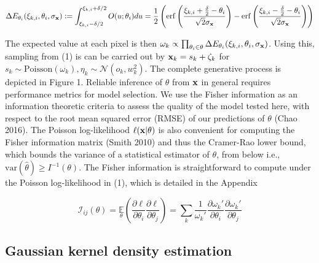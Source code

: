 \documentclass{article}
\begin{document}
\begin{equation}
\Delta E_{\theta_{i}}(\xi_{k,i},\theta_{i},\sigma_{\bold{x}}) \vcentcolon = \int_{\xi_{k,i}-\delta /2}^{\xi_{k,i}+\delta /2} O(u;\theta_{i})du = \frac{1}{2}\left(\mathrm{erf}\left(\frac{\xi_{k,i}+\frac{\delta}{2}-\theta_{i}}{\sqrt{2}\sigma_{\bold{x}}}\right) -\mathrm{erf}\left(\frac{\xi_{k,i}-\frac{\delta}{2}-\theta_{i}}{\sqrt{2}\sigma_{\bold{x}}}\right)\right)
\end{equation}

The expected value at each pixel is then $\omega_{k}\propto \prod_{\theta_{i}\in \theta} \Delta E_{\theta_{i}}(\xi_{k,i},\theta_{i},\sigma_{\bold{x}}) $. Using this, sampling from (1) is can be carried out by $\bold{x}_{k} = s_{k} + \zeta_{k}$ for $s_{k}\sim \mathrm{Poisson}(\omega_{k}), \eta_{k}\sim \mathcal{N}(o_{k},w_{k}^{2})$. The complete generative process is depicted in Figure 1. Reliable inference of $\theta$ from $\bold{x}$ in general requires performance metrics for model selection. We use the Fisher information as an information theoretic criteria to assess the quality of the model tested here, with respect to the root mean squared error (RMSE) of our predictions of $\theta$ (Chao 2016). The Poisson log-likelihood $\ell(\bold{x}|\theta)$ is also convenient for computing the Fisher information matrix (Smith 2010) and thus the Cramer-Rao lower bound, which bounds the variance of a statistical estimator of $\theta$, from below i.e., $\mathrm{var}(\hat{\theta}) \geq I^{-1}(\theta)$. The Fisher information is straightforward to compute under the Poisson log-likelihood in (1), which is detailed in the Appendix

\begin{equation}
\mathcal{I}_{ij}(\theta) = \underset{\theta}{\mathbb{E}}\left(\frac{\partial \ell}{\partial\theta_{i}}\frac{\partial\ell}{\partial\theta_{j}}\right) = \sum_{k}\frac{1}{\omega_{k}'}\frac{\partial \omega_{k}'}{\partial\theta_{i}}\frac{\partial \omega_{k}'}{\partial\theta_{j}}
\end{equation}

\subsection{Gaussian kernel density estimation}
\end{document}
